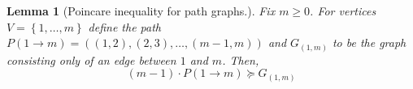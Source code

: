 \documentclass{article}
\newcommand{\set}[1]{\left\{#1\right\}}
\newcommand{\1}{\mathbf{1}}
\theoremstyle{alden}
\theoremstyle{aldenthm}
\newtheorem{lemma}{Lemma}
\theoremstyle{definition}
\theoremstyle{remark}
\begin{document}
\begin{lemma}[Poincare inequality for path graphs.]
	\label{lem: path_poincare}
	Fix $m \geq 0$. For vertices $V = \set{1, \ldots,m}$ define the path $P(1 \to m) = ((1,2),(2,3),\ldots, (m-1,m))$ and $G_{(1,m)}$ to be the graph consisting only of an edge between $1$ and $m$. Then,
	\begin{equation*}
	(m - 1) \cdot P(1 \to m) \succeq G_{(1,m)}
	\end{equation*}
\end{lemma}
\end{document}
